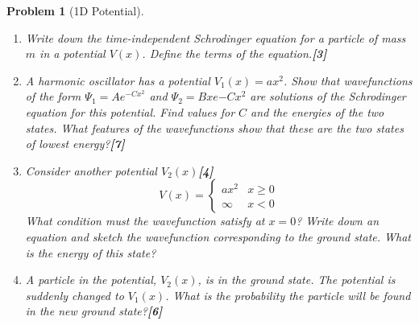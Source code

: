 \documentclass[a4paper]{article}
\theoremstyle{new}
\newtheorem{qns}{Problem}[subsection]
\begin{document}
\newpage
\begin{qns}[1D Potential]\leavevmode
\begin{enumerate}[label=(\alph*)]
\item Write down the time-independent Schrodinger equation for a particle of mass $m$ in a potential $V(x)$. Define the terms of the equation.\hfill\textbf{[3]}
\item A harmonic oscillator has a potential $V_1(x) = ax^2$. Show that wavefunctions of the form $\Psi_1=Ae^{-Cx^2}$ and $\Psi_2=Bxe{-Cx^2}$ are solutions of the Schrodinger equation for this potential. Find values for $C$ and the energies of the two states. What features of the wavefunctions show that these are the two states of lowest energy?\hfill\textbf{[7]}
\item Consider another potential $V_2(x)$\hfill\textbf{[4]}
$$V(x)=
\left\{
        \begin{array}{ll}
      ax^2 & x\geq0 \\
      \infty & x<0
        \end{array}
    \right.$$
What condition must the wavefunction satisfy at $x=0$? Write down an equation and sketch the wavefunction corresponding to the ground state. What is the energy of this state?
\item A particle in the potential, $V_2(x)$, is in the ground state. The potential is suddenly changed to $V_1(x)$. What is the probability the particle will be found in the new ground state?\hfill\textbf{[6]}
\end{enumerate}
\begin{mdframed}
\end{mdframed}
\end{qns}
\end{document}
